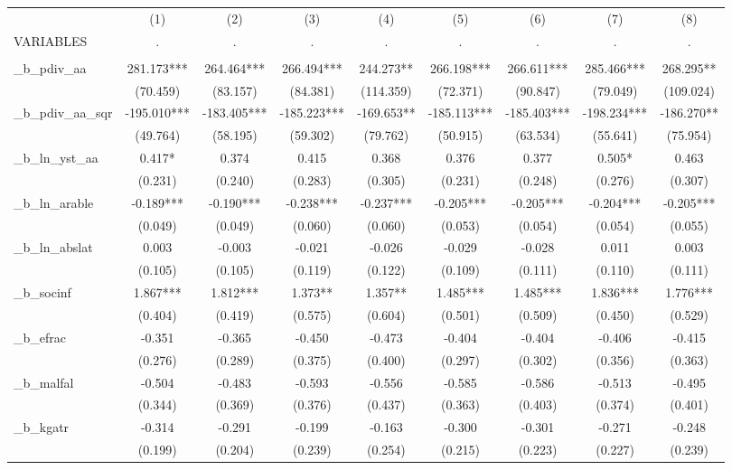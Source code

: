 \documentclass[]{article}
\begin{document}
\begin{tabular}{lcccccccc} \hline
 & (1) & (2) & (3) & (4) & (5) & (6) & (7) & (8) \\
VARIABLES & . & . & . & . & . & . & . & . \\ \hline
 &  &  &  &  &  &  &  &  \\
\_b\_pdiv\_aa & 281.173*** & 264.464*** & 266.494*** & 244.273** & 266.198*** & 266.611*** & 285.466*** & 268.295** \\
 & (70.459) & (83.157) & (84.381) & (114.359) & (72.371) & (90.847) & (79.049) & (109.024) \\
\_b\_pdiv\_aa\_sqr & -195.010*** & -183.405*** & -185.223*** & -169.653** & -185.113*** & -185.403*** & -198.234*** & -186.270** \\
 & (49.764) & (58.195) & (59.302) & (79.762) & (50.915) & (63.534) & (55.641) & (75.954) \\
\_b\_ln\_yst\_aa & 0.417* & 0.374 & 0.415 & 0.368 & 0.376 & 0.377 & 0.505* & 0.463 \\
 & (0.231) & (0.240) & (0.283) & (0.305) & (0.231) & (0.248) & (0.276) & (0.307) \\
\_b\_ln\_arable & -0.189*** & -0.190*** & -0.238*** & -0.237*** & -0.205*** & -0.205*** & -0.204*** & -0.205*** \\
 & (0.049) & (0.049) & (0.060) & (0.060) & (0.053) & (0.054) & (0.054) & (0.055) \\
\_b\_ln\_abslat & 0.003 & -0.003 & -0.021 & -0.026 & -0.029 & -0.028 & 0.011 & 0.003 \\
 & (0.105) & (0.105) & (0.119) & (0.122) & (0.109) & (0.111) & (0.110) & (0.111) \\
\_b\_socinf & 1.867*** & 1.812*** & 1.373** & 1.357** & 1.485*** & 1.485*** & 1.836*** & 1.776*** \\
 & (0.404) & (0.419) & (0.575) & (0.604) & (0.501) & (0.509) & (0.450) & (0.529) \\
\_b\_efrac & -0.351 & -0.365 & -0.450 & -0.473 & -0.404 & -0.404 & -0.406 & -0.415 \\
 & (0.276) & (0.289) & (0.375) & (0.400) & (0.297) & (0.302) & (0.356) & (0.363) \\
\_b\_malfal & -0.504 & -0.483 & -0.593 & -0.556 & -0.585 & -0.586 & -0.513 & -0.495 \\
 & (0.344) & (0.369) & (0.376) & (0.437) & (0.363) & (0.403) & (0.374) & (0.401) \\
\_b\_kgatr & -0.314 & -0.291 & -0.199 & -0.163 & -0.300 & -0.301 & -0.271 & -0.248 \\
 & (0.199) & (0.204) & (0.239) & (0.254) & (0.215) & (0.223) & (0.227) & (0.239) \\

\end{tabular}
\end{document}
